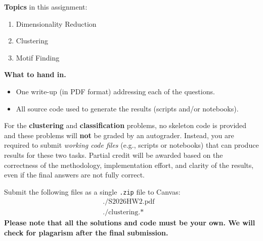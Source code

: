\noindent 
{\bf Topics} in this assignment: 
\begin{enumerate}
\item Dimensionality Reduction
\item Clustering\
\item Motif Finding
\end{enumerate}
\vspace{0.2in}


\noindent
{\bf What to hand in.}
\begin{itemize}
\item One write-up (in PDF format) addressing each of the questions.
\item All source code used to generate the results (scripts and/or notebooks).
\end{itemize}

\noindent
For the \textbf{clustering} and \textbf{classification} problems, no skeleton code is provided and these problems will \textbf{not} be graded by an autograder.  
Instead, you are required to submit \emph{working code files} (e.g., scripts or notebooks) that can produce results for these two tasks.  
Partial credit will be awarded based on the correctness of the methodology, implementation effort, and clarity of the results, even if the final answers are not fully correct.

\noindent
Submit the following files as a single \texttt{.zip} file to Canvas:
\[
  \begin{array}{lllll}
    ./\text{S2026HW2.pdf} & \\
    ./\text{clustering.*} &
  \end{array}
\]
\textbf{ Please note that all the solutions and code must be your own. We will check for plagarism after the final submission. } 